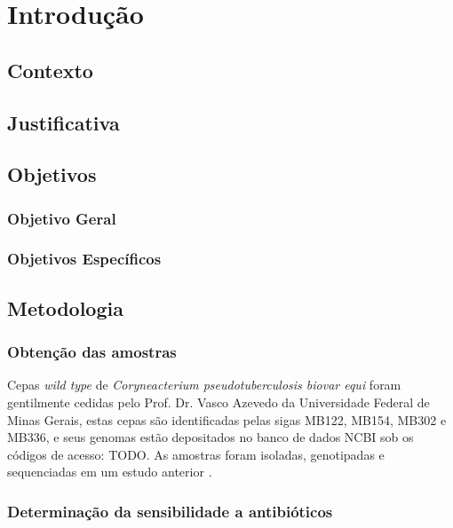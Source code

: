 \chapter{Introdução}
\label{cap:introducao}

\section{Contexto}

\section{Justificativa}

\section{Objetivos}

\subsection{Objetivo Geral}

\subsection{Objetivos Específicos}

\section{Metodologia}

\subsection{Obtenção das amostras}

Cepas \textit{wild type} de \textit{Coryneacterium pseudotuberculosis biovar equi} foram gentilmente cedidas pelo Prof. Dr. Vasco Azevedo 
da Universidade Federal de Minas Gerais, estas cepas são identificadas pelas sigas MB122, MB154, MB302 e MB336, e seus genomas estão
depositados no banco de dados NCBI sob os códigos de acesso: TODO. As amostras foram isoladas, genotipadas e sequenciadas em um estudo anterior \cite{barauna2017}.



\subsection{Determinação da sensibilidade a antibióticos}

